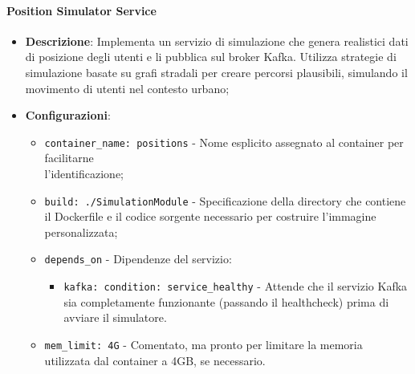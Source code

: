 \documentclass[10pt]{article}
\begin{document}
        \paragraph{Position Simulator Service}
        \begin{itemize} 
        \item \textbf{Descrizione}: Implementa un servizio di simulazione che genera realistici dati di posizione degli utenti e li pubblica sul broker Kafka. Utilizza strategie di simulazione basate su grafi stradali per creare percorsi plausibili, simulando il movimento di utenti nel contesto urbano;
        \item \textbf{Configurazioni}:
        \begin{itemize}
            \item \texttt{container\_name: positions} - Nome esplicito assegnato al container per facilitarne\\ l'identificazione;
            \item \texttt{build: ./SimulationModule} - Specificazione della directory che contiene il Dockerfile e il codice sorgente necessario per costruire l'immagine personalizzata;
            \item \texttt{depends\_on} - Dipendenze del servizio:
            \begin{itemize}
                \item \texttt{kafka: condition: service\_healthy} - Attende che il servizio Kafka sia completamente funzionante (passando il healthcheck) prima di avviare il simulatore.
            \end{itemize}
            \item \texttt{mem\_limit: 4G} - Comentato, ma pronto per limitare la memoria utilizzata dal container a 4GB, se necessario.
        \end{itemize}
        

\end{itemize}
\end{document}
